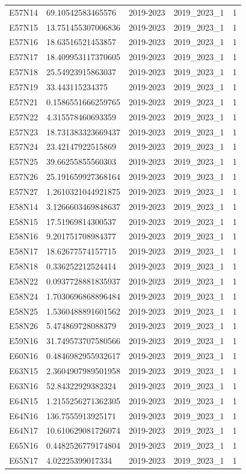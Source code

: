 \begin{landscape}
\begin{longtable}{lllll}
E57N14 & 69.10542583465576 & 2019-2023 & 2019\_2023\_1 & 1 \\
E57N15 & 13.751455307006836 & 2019-2023 & 2019\_2023\_1 & 1 \\
E57N16 & 18.63516521453857 & 2019-2023 & 2019\_2023\_1 & 1 \\
E57N17 & 18.409953117370605 & 2019-2023 & 2019\_2023\_1 & 1 \\
E57N18 & 25.54923915863037 & 2019-2023 & 2019\_2023\_1 & 1 \\
E57N19 & 33.443115234375 & 2019-2023 & 2019\_2023\_1 & 1 \\
E57N21 & 0.1586551666259765 & 2019-2023 & 2019\_2023\_1 & 1 \\
E57N22 & 4.315578460693359 & 2019-2023 & 2019\_2023\_1 & 1 \\
E57N23 & 18.731383323669437 & 2019-2023 & 2019\_2023\_1 & 1 \\
E57N24 & 23.42147922515869 & 2019-2023 & 2019\_2023\_1 & 1 \\
E57N25 & 39.66255855560303 & 2019-2023 & 2019\_2023\_1 & 1 \\
E57N26 & 25.191659927368164 & 2019-2023 & 2019\_2023\_1 & 1 \\
E57N27 & 1.2610321044921875 & 2019-2023 & 2019\_2023\_1 & 1 \\
E58N14 & 3.1266603469848637 & 2019-2023 & 2019\_2023\_1 & 1 \\
E58N15 & 17.51969814300537 & 2019-2023 & 2019\_2023\_1 & 1 \\
E58N16 & 9.201751708984377 & 2019-2023 & 2019\_2023\_1 & 1 \\
E58N17 & 18.62677574157715 & 2019-2023 & 2019\_2023\_1 & 1 \\
E58N18 & 0.336252212524414 & 2019-2023 & 2019\_2023\_1 & 1 \\
E58N22 & 0.0937728881835937 & 2019-2023 & 2019\_2023\_1 & 1 \\
E58N24 & 1.7030696868896484 & 2019-2023 & 2019\_2023\_1 & 1 \\
E58N25 & 1.5360488891601562 & 2019-2023 & 2019\_2023\_1 & 1 \\
E58N26 & 5.474869728088379 & 2019-2023 & 2019\_2023\_1 & 1 \\
E59N16 & 31.749573707580566 & 2019-2023 & 2019\_2023\_1 & 1 \\
E60N16 & 0.4846982955932617 & 2019-2023 & 2019\_2023\_1 & 1 \\
E63N15 & 2.3604907989501958 & 2019-2023 & 2019\_2023\_1 & 1 \\
E63N16 & 52.84322929382324 & 2019-2023 & 2019\_2023\_1 & 1 \\
E64N15 & 1.2155256271362305 & 2019-2023 & 2019\_2023\_1 & 1 \\
E64N16 & 136.7555913925171 & 2019-2023 & 2019\_2023\_1 & 1 \\
E64N17 & 10.610629081726074 & 2019-2023 & 2019\_2023\_1 & 1 \\
E65N16 & 0.4482526779174804 & 2019-2023 & 2019\_2023\_1 & 1 \\
E65N17 & 4.02225399017334 & 2019-2023 & 2019\_2023\_1 & 1 \\
\bottomrule
\end{longtable}
\end{landscape}
